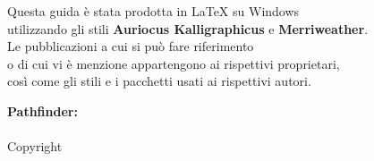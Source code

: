 	\thispagestyle{empty}
	\hfill
	\vspace{3cm}
	\begin{center}
		{\small 	Questa guida è stata prodotta in {\normalsize \LaTeX} su Windows\\
			utilizzando gli stili \textbf{Auriocus Kalligraphicus} e \textbf{Merriweather}.\\
			Le pubblicazioni a cui si può fare riferimento\\
			o di cui vi è menzione appartengono ai rispettivi proprietari,\\
			così come gli stili e i pacchetti usati ai rispettivi autori.\par}
	\end{center}
	\vfill
	\begin{center}
		{\small\textbf{ Pathfinder:} \setitle \\
			\seauthor\\
			Copyright \textcopyright{}}
	\end{center}	